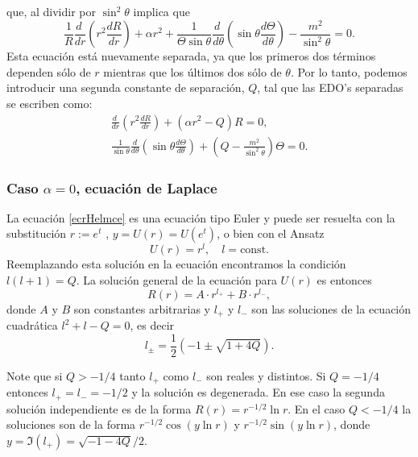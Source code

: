 que, al dividir por $\sin^2\theta$ implica que
\begin{equation}
    \frac{1}{R}\frac{d\ }{dr}\left(r^2\frac{dR}{dr}\right)+\alpha r^2
    +\frac{1}{\Theta\sin\theta}\frac{d\ }{d\theta}\left(\sin\theta\frac{
        d\Theta}{d\theta}\right) -\frac{m^2}{\sin^2\theta} = 0.
\end{equation}
Esta ecuación está nuevamente separada, ya que los primeros dos términos dependen sólo de $r$ mientras que los últimos dos sólo de $\theta$. Por lo tanto, podemos introducir una segunda constante de separación, $Q$, tal que las EDO's separadas se escriben como:
\begin{gather}
    \frac{d\ }{dr}\left(r^2\frac{dR}{dr}\right)+\left(\alpha r^2-Q\right)R=0, \label{ecrHelmce}\\
    \frac{1}{\sin\theta}\frac{d}{d\theta}\left(\sin\theta\frac{d\Theta}{d\theta}\right)
    +\left(Q-\frac{m^2}{\sin^2\theta}\right) \Theta = 0. \label{ecThHelm}
\end{gather}

\subsubsection{Caso $\alpha=0$, ecuación de Laplace}
La ecuación \eqref{ecrHelmce} es una ecuación tipo Euler y puede ser resuelta con la
substitución $r:=e^t$ , $y=U(r)=U(e^t)$, o bien con el Ansatz
\begin{equation}
    U(r) = r^l,\quad l=\text{const.}
\end{equation}
Reemplazando esta solución en la ecuación encontramos la condición
$l(l+1)=Q$. La solución general de la ecuación para $U(r)$ es entonces
\begin{equation}
    R(r) = A\cdot r^{l_+} + B\cdot r^{l_-},\label{loes2}
\end{equation}
donde $A$ y $B$ son constantes arbitrarias y $l_+$ y $l_-$ son las soluciones de la ecuación cuadrática $l^2+l-Q=0$, es decir
\begin{equation}
    l_\pm = \frac{1}{2}\left(-1\pm\sqrt{1+4Q}\right).
\end{equation}

Note que si $Q>-1/4$ tanto $l_+$ como $l_-$ son reales y distintos. Si $Q=-1/4$ entonces $l_+=l_-=-1/2$ y la solución es degenerada. En ese caso la segunda solución independiente es de la forma $R(r) = r^{-1/2}\ln r$. En el caso $Q<-1/4$ la soluciones son de la forma $r^{-1/2}\cos(y\ln r)$ y $r^{-1/2}\sin(y\ln r)$, donde $y=\Im(l_+)=\sqrt{-1-4Q}/2$.


